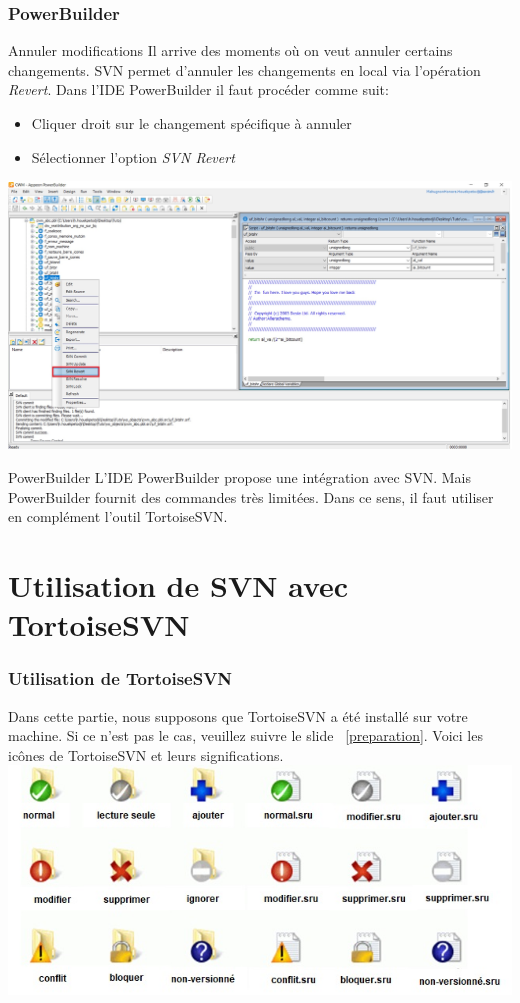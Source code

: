 \documentclass{beamer}
\begin{document}
\begin{frame}
\frametitle{PowerBuilder}
\begin{block}{ Annuler modifications}
Il arrive des moments où on veut annuler  certains changements. SVN permet d'annuler les changements en local via l'opération \alert{\textit{Revert}}. Dans l'IDE PowerBuilder il faut procéder comme suit:
\begin{itemize}
\item Cliquer  droit sur le changement spécifique à annuler
\item Sélectionner l'option \alert{\textit{SVN Revert}}
\end{itemize}
\end{block}
\includegraphics[scale=0.2]{../images/annulerM.jpg}
\end{frame}

\begin{frame}{PowerBuilder }
L'IDE PowerBuilder  propose une intégration avec SVN. Mais PowerBuilder fournit des commandes très limitées. Dans ce sens, il faut utiliser en complément l'outil \alert{TortoiseSVN}. 
\end{frame}

\section{Utilisation de SVN avec TortoiseSVN}

\begin{frame}
\frametitle{Utilisation de TortoiseSVN}
Dans cette partie, nous supposons que TortoiseSVN a été  installé sur votre machine. Si ce n'est pas le cas, veuillez suivre le slide ~\ref{preparation}.
 Voici les icônes de TortoiseSVN et leurs significations.
\includegraphics[scale=.7]{../images/icon.jpg} 
\end{frame}
\end{document}
